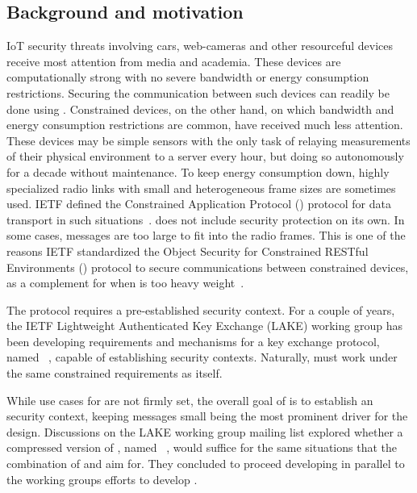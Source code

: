 \documentclass[runningheads, envcountsame, a4paper, draft, x11names]{llncs}
\newcommand{\fillhack}{\vspace{-0.5em}}
\begin{document}
\subsection{Background and motivation}
\label{sec:motivation}
\fillhack
IoT security threats involving cars, web-cameras and other resourceful devices
receive most attention from media and academia.
%
These devices are computationally strong with no severe bandwidth or energy
consumption restrictions.
%
Securing the communication between such devices can readily be done using
\mDandTls.
%
Constrained devices, on the other hand, on which bandwidth and
energy consumption restrictions are common, have received much less attention.
%
These devices may be simple sensors with the only task of relaying
measurements of their physical environment to a server every hour, but doing so
autonomously for a decade without maintenance.
%
To keep energy consumption down, highly specialized radio links with small
and heterogeneous frame sizes are sometimes used.
%
IETF defined the Constrained Application Protocol (\mCoap{}) protocol for data
transport in such situations~\cite{rfc7252}.
%
\mCoap{} does not include security protection on its own.
%
In some cases, \mDandTls{} messages are too large to fit into the radio frames.
%
This is one of the reasons IETF standardized the Object Security for
Constrained RESTful Environments (\mOscore{}) protocol to secure
communications between constrained devices, as a complement for when
\mDandTls{} is too heavy weight~\cite{rfc8613}.
%

The \mOscore{} protocol requires a pre-established security context.
%
For a couple of years, the IETF Lightweight Authenticated Key Exchange (LAKE)
working group has been developing requirements and mechanisms for a key
exchange protocol, named \mEdhoc~\cite{selander-lake-edhoc-01}, capable of
establishing \mOscore{} security contexts.
%
Naturally, \mEdhoc{} must work under the same constrained requirements as
\mOscore{} itself.
%

While use cases for \mEdhoc{} are not firmly set,
the overall goal of \mEdhoc{} is to establish an \mOscore{} security
context, keeping messages small being the most prominent driver for the
design.
%
Discussions on the LAKE working group mailing list explored whether a
compressed version of \mTls, named \mCtls~\cite{ietf-tls-ctls-00}, would suffice
for the same situations that
the combination of \mOscore{} and \mEdhoc{} aim for.
%
They concluded to proceed developing \mEdhoc{} in parallel to the \mTls{}
working groups efforts to develop \mCtls.
%
\end{document}
